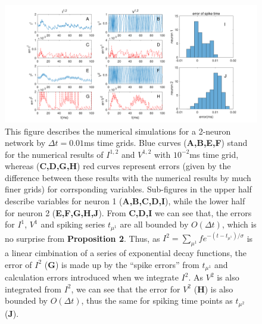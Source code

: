 \documentclass[10pt]{article}
\begin{document}
\begin{figure}
\includegraphics[width=\textwidth]{2neurons.pdf}
\caption{\color{Gray}This figure describes the numerical simulations for a 2-neuron network by $\Delta t =0.01$ms time grids. Blue curves (\textbf{A,B,E,F}) stand for the numerical results of $I^{1,2}$ and $V^{1,2}$ with $10^{-2}$ms time grid, whereas (\textbf{C,D,G,H}) red curves represent errors (given by the difference between these results with the numerical results by much finer grids) for corrsponding variables. Sub-figures in the upper half describe variables for neuron 1 (\textbf{A,B,C,D,I}), while the lower half for neuron 2 (\textbf{E,F,G,H,J}). From \textbf{C,D,I} we can see that, the errors for $I^{1}$,  $V^{1}$ and spiking series $t_{\mu^1}$ are all bounded by $O(\Delta t)$, which is no surprise from {\bf{Proposition 2}}. Thus, as $I^{2}=\sum_{\mu^1}fe^{-(t-t_{\mu^1})/\sigma}$ is a linear cimbination of a series of exponential decay functions, the error of $I^{2}$ (\textbf{G}) is made up by the “spike errors” from $t_{\mu^1}$ and calculation errors introduced when we integrate $I^{2}$. As $V^{2}$ is also integrated from $I^{2}$, we can see that the error for $V^{2}$ (\textbf{H}) is also bounded by $O(\Delta t)$, thus the same for spiking time points as $t_{\mu^2}$ (\textbf{J}).} 
\label{2neurons} %
\end{figure}
\end{document}
